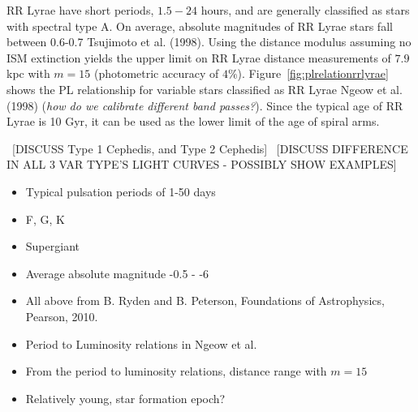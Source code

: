 \documentclass[letterpaper,11pt]{article}
\begin{document}
RR Lyrae have short periods, $1.5 - 24$ hours, and are generally classified as stars with spectral type A.  On average, absolute magnitudes of RR Lyrae stars fall between 0.6-0.7 Tsujimoto et al. (1998). Using the distance modulus assuming no ISM extinction yields the upper limit on RR Lyrae distance measurements of $7.9$ kpc with $m=15$ (photometric accuracy of $4\%$). Figure~\ref{fig:plrelationrrlyrae} shows the PL relationship for variable stars classified as RR Lyrae Ngeow et al. (1998) (\textit{how do we calibrate different band passes?}). Since the typical age of RR Lyrae is 10 Gyr, it can be used as the lower limit of the age of spiral arms.  

~[DISCUSS Type 1 Cephedis, and Type 2 Cephedis]
~[DISCUSS DIFFERENCE IN ALL 3 VAR TYPE'S LIGHT CURVES - POSSIBLY SHOW EXAMPLES]
\begin{itemize}
	\item{} Typical pulsation periods of 1-50 days
	\item{} F, G, K
	\item{} Supergiant
	\item{} Average absolute magnitude -0.5 - -6
	\item{} All above from B. Ryden and B. Peterson, Foundations of Astrophysics, Pearson, 2010.
	\item{} Period to Luminosity relations in Ngeow et al. 
	\item{} From the period to luminosity relations, distance range with $m=15$
	\item{} Relatively young, star formation epoch?
\end{itemize}
\end{document}

